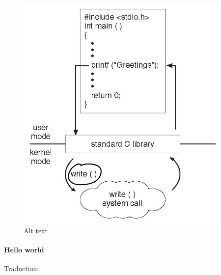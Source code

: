 \begin{figure}
\centering
\includegraphics{image-14.png}
\caption{Alt text}
\end{figure}

\paragraph{Hello world}\label{hello-world}

\begin{Shaded}
\begin{Highlighting}[]

\OperatorTok{(}\OperatorTok{,}  \OperatorTok{*}\OperatorTok{[])\{}
\OperatorTok{(}\OperatorTok{,}\OperatorTok{(}\OperatorTok{));}
   \OperatorTok{;}
\OperatorTok{\}}
\end{Highlighting}
\end{Shaded}

Traduction:

